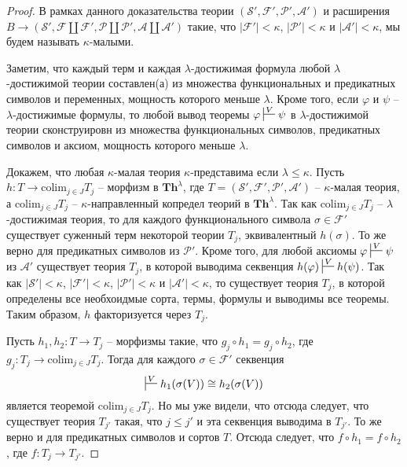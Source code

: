 \documentclass[reqno]{amsart}
\theoremstyle{definition}
\theoremstyle{remark}
\newcommand{\bcat}[1]{\mathbf{#1}}
\newcommand{\fs}[1]{\mathrm{#1}}
\newcommand{\Th}{\bcat{Th}}
\newcommand{\colim}{\fs{colim}}
\begin{document}
\begin{proof}
В рамках данного доказательства теории $(\mathcal{S}',\mathcal{F}',\mathcal{P}',\mathcal{A}')$ и расширения $B \to (\mathcal{S}', \mathcal{F} \amalg \mathcal{F}', \mathcal{P} \amalg \mathcal{P}', \mathcal{A} \amalg \mathcal{A}')$ такие,
что $|\mathcal{F}'| < \kappa$, $|\mathcal{P}'| < \kappa$ и $|\mathcal{A}'| < \kappa$, мы будем называть $\kappa$-малыми.

Заметим, что каждый терм и каждая $\lambda$-достижимая формула любой $\lambda$-достижимой теории составлен(а) из множества функциональных и предикатных символов и переменных, мощность которого меньше $\lambda$.
Кроме того, если $\varphi$ и $\psi$ -- $\lambda$-достижимые формулы,
то любой вывод теоремы $\varphi \sststile{}{V} \psi$ в $\lambda$-достижимой теории сконструировн из множества функциональных символов, предикатных символов и аксиом, мощность которого меньше $\lambda$.

Докажем, что любая $\kappa$-малая теория $\kappa$-представима если $\lambda \leq \kappa$.
Пусть $h : T \to \colim_{j \in J} T_j$ -- морфизм в $\Th^\lambda$, где $T = (\mathcal{S}',\mathcal{F}',\mathcal{P}',\mathcal{A}')$ -- $\kappa$-малая теория, а $\colim_{j \in J} T_j$ -- $\kappa$-направленный копредел теорий в $\Th^\lambda$.
Так как $\colim_{j \in J} T_j$ -- $\lambda$-достижимая теория, то для каждого функционального символа $\sigma \in \mathcal{F}'$ существует суженный терм некоторой теории $T_j$, эквивалентный $h(\sigma)$.
То же верно для предикатных символов из $\mathcal{P}'$.
Кроме того, для любой аксиомы $\varphi \sststile{}{V} \psi$ из $\mathcal{A}'$ существует теория $T_j$, в которой выводима секвенция $h(\varphi) \sststile{}{V} h(\psi)$.
Так как $|\mathcal{S}'| < \kappa$, $|\mathcal{F}'| < \kappa$, $|\mathcal{P}'| < \kappa$ и $|\mathcal{A}'| < \kappa$, то существует теория $T_j$, в которой определены все необхоидмые сорта, термы, формулы и выводимы все теоремы.
Таким образом, $h$ факторизуется через $T_j$.

Пусть $h_1,h_2 : T \to T_j$ -- морфизмы такие, что $g_j \circ h_1 = g_j \circ h_2$, где $g_j : T_j \to \colim_{j \in J} T_j$.
Тогда для каждого $\sigma \in \mathcal{F}'$ секвенция
\[ \sststile{}{V} h_1(\sigma(V)) \cong h_2(\sigma(V)) \]
является теоремой $\colim_{j \in J} T_j$.
Но мы уже видели, что отсюда следует, что существует теория $T_{j'}$ такая, что $j \leq j'$ и эта секвенция выводима в $T_{j'}$.
То же верно и для предикатных символов и сортов $T$.
Отсюда следует, что $f \circ h_1 = f \circ h_2$, где $f : T_j \to T_{j'}$.


\end{proof}
\end{document}
